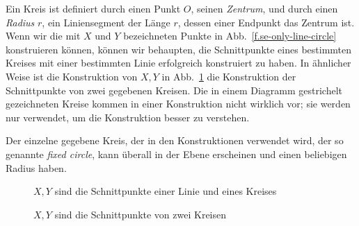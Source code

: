 Ein Kreis ist definiert durch einen Punkt $O$, seinen \emph{Zentrum}, und durch einen \emph{Radius} $r$, ein Liniensegment der Länge $r$, dessen einer Endpunkt das Zentrum ist. Wenn wir die mit $X$ und $Y$ bezeichneten Punkte in Abb.~\ref{f.se-only-line-circle} konstruieren können, können wir behaupten, die Schnittpunkte eines bestimmten Kreises mit einer bestimmten Linie erfolgreich konstruiert zu haben. In ähnlicher Weise ist die Konstruktion von $X,Y$ in Abb.~\ref{f.se-only-two-circles} die Konstruktion der Schnittpunkte von zwei gegebenen Kreisen. Die in einem Diagramm gestrichelt gezeichneten Kreise kommen in einer Konstruktion nicht wirklich vor; sie werden nur verwendet, um die Konstruktion besser zu verstehen.

Der einzelne gegebene Kreis, der in den Konstruktionen verwendet wird, der so genannte \emph{fixed circle}, kann überall in der Ebene erscheinen und einen beliebigen Radius haben.

\begin{figure}[t]
\begin{minipage}{.45\textwidth}
\begin{center}
\caption{$X,Y$ sind die Schnittpunkte einer Linie und eines Kreises}\label{f.se-only-line-circle}
\end{center}
\end{minipage}
\hfill
\begin{minipage}{.45\textwidth}
\begin{center}
\caption{$X,Y$ sind die Schnittpunkte von zwei Kreisen}\label{f.se-only-two-circles}
\end{center}
\end{minipage}
\end{figure}

